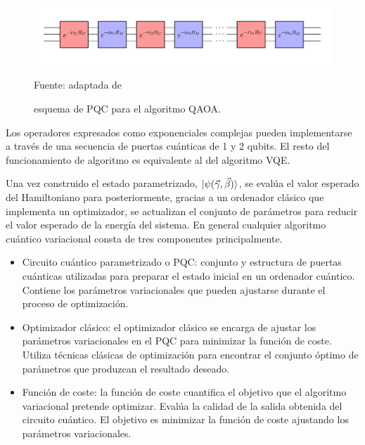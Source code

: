\begin{figure}[!ht]
    \centering
    \includegraphics[scale = 0.4]{img/03-qaoa_layers.png}
    \caption{esquema de \mbox{PQC} para el algoritmo QAOA.}
    Fuente: adaptada de \cite{jack}
    \label{fig:qaoa_layers}
\end{figure}

Los operadores expresados como exponenciales complejas pueden implementarse a través de una secuencia de puertas cuánticas de 1 y 2 qubits. El resto del funcionamiento de algoritmo es equivalente al del algoritmo VQE. 

\newpage

Una vez construido el estado parametrizado, $\ket{\psi(\Vec{\gamma}, \Vec{\beta})}$, se evalúa el valor esperado del Hamiltoniano para posteriormente, gracias a un ordenador clásico que implementa un optimizador, se actualizan el conjunto de parámetros para reducir el valor esperado de la energía del sistema. En general cualquier algoritmo cuántico variacional consta de tres componentes principalmente. 

\begin{itemize}
    
    \item Circuito cuántico parametrizado o \mbox{PQC}: conjunto y estructura de puertas cuánticas utilizadas para preparar el estado inicial en un ordenador cuántico. Contiene los parámetros variacionales que pueden ajustarse durante el proceso de optimización.

    \item Optimizador clásico: el optimizador clásico se encarga de ajustar los parámetros variacionales en el \mbox{PQC} para minimizar la función de coste. Utiliza técnicas clásicas de optimización para encontrar el conjunto óptimo de parámetros que produzcan el resultado deseado.

    \item Función de coste: la función de coste cuantifica el objetivo que el algoritmo variacional pretende optimizar. Evalúa la calidad de la salida obtenida del circuito cuántico. El objetivo es minimizar la función de coste ajustando los parámetros variacionales.
    
\end{itemize}

